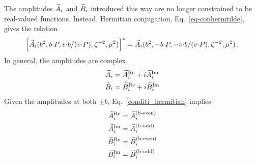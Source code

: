 The amplitudes $\widetilde{A}_i$ and $\widetilde{B}_i$ introduced this way are no longer constrained to be real-valued functions. Instead, Hermitian conjugation, Eq.\ \eqref{eq-conhermtilde}, gives the relation
\begin{equation}
	\left[ \widetilde{A}_i(b^2,b {\cdot} P, v {\cdot} b / (v {\cdot} P), \zeta^{-2},\mu^2) \right]^* = \widetilde{A}_i(b^2,-b {\cdot} P, -v {\cdot} b / (v {\cdot} P), \zeta^{-2},\mu^2)\, .\label{conditi_hermitian}
\end{equation}
In general, the amplitudes are complex,
\begin{align}
    \widetilde{A}_i&=\widetilde{A}_i^{\text{Re}}+i\widetilde{A}_i^{\text{Im}}\\
    \widetilde{B}_i&=\widetilde{B}_i^{\text{Re}}+i\widetilde{B}_i^{\text{Im}}
\end{align}
Given the amplitudes at both $\pm b$, Eq.\ \eqref{conditi_hermitian} implies
\begin{subequations}
\label{eq-ReIm-parity}
\begin{align}
    \widetilde{A}_i^{\text{Re}}&=\widetilde{A}_i^{\text{(b-even)}}\\
    \widetilde{A}_i^{\text{Im}}&=\widetilde{A}_i^{\text{(b-odd)}}\\
    \widetilde{B}_i^{\text{Re}}&=\widetilde{B}_i^{\text{(b-even)}}\\
    \widetilde{B}_i^{\text{Im}}&=\widetilde{B}_i^{\text{(b-odd)}}
\end{align}
\end{subequations}


